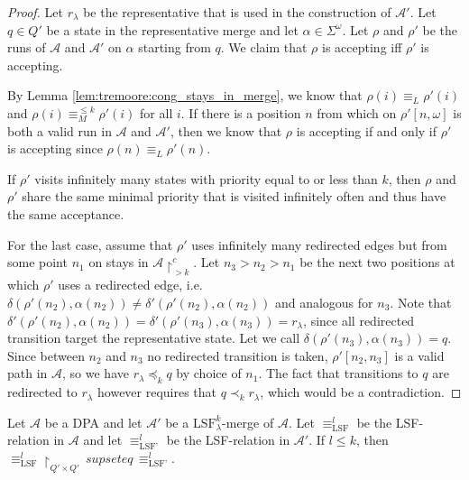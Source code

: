 \begin{proof}
	Let $r_\lambda$ be the representative that is used in the construction of $\mathcal{A}'$. Let $q \in Q'$ be a state in the representative merge and let $\alpha \in \Sigma^\omega$. Let $\rho$ and $\rho'$ be the runs of $\mathcal{A}$ and $\mathcal{A}'$ on $\alpha$ starting from $q$. We claim that $\rho$ is accepting iff $\rho'$ is accepting.
	
	By Lemma \ref{lem:tremoore:cong_stays_in_merge}, we know that $\rho(i) \equiv_L \rho'(i)$ and $\rho(i) \equiv_M^{\leq k} \rho'(i)$ for all $i$. If there is a position $n$ from which on $\rho'[n,\omega]$ is both a valid run in $\mathcal{A}$ and $\mathcal{A}'$, then we know that $\rho$ is accepting if and only if $\rho'$ is accepting since $\rho(n) \equiv_L \rho'(n)$.
	
	If $\rho'$ visits infinitely many states with priority equal to or less than $k$, then $\rho$ and $\rho'$ share the same minimal priority that is visited infinitely often and thus have the same acceptance.
	
	For the last case, assume that $\rho'$ uses infinitely many redirected edges but from some point $n_1$ on stays in $\mathcal{A}\upharpoonright^c_{>k}$. Let $n_3 > n_2 > n_1$ be the next two positions at which $\rho'$ uses a redirected edge, i.e. $\delta(\rho'(n_2), \alpha(n_2)) \neq \delta'(\rho'(n_2), \alpha(n_2))$ and analogous for $n_3$. Note that $\delta'(\rho'(n_2), \alpha(n_2)) = \delta'(\rho'(n_3), \alpha(n_3)) = r_\lambda$, since all redirected transition target the representative state. Let we call $\delta(\rho'(n_3), \alpha(n_3)) = q$. Since between $n_2$ and $n_3$ no redirected transition is taken, $\rho'[n_2, n_3]$ is a valid path in $\mathcal{A}$, so we have $r_\lambda \preceq_k q$ by choice of $n_1$. The fact that transitions to $q$ are redirected to $r_\lambda$ however requires that $q \prec_k r_\lambda$, which would be a contradiction.
\end{proof}


\begin{lem}
	Let $\mathcal{A}$ be a DPA and let $\mathcal{A}'$ be a $\text{LSF}_\lambda^k$-merge of $\mathcal{A}$. Let $\equiv_\text{LSF}^l$ be the LSF-relation in $\mathcal{A}$ and let $\equiv_\text{LSF'}^l$ be the LSF-relation in $\mathcal{A}'$. If $l \leq k$, then $\equiv_\text{LSF}^l \upharpoonright_{Q' \times Q'} \,supseteq\, \equiv_\text{LSF'}^l$.
	\label{lem:lsf:constr_does_not_change_lower_k}
\end{lem}

